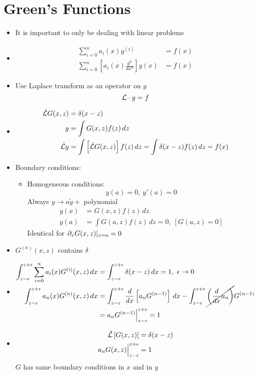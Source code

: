 \documentclass[Maths.tex]{subfiles}
\begin{document}
\section{Green's Functions}

\begin{itemize}
    \item It is important to only be dealing with linear problems
    \item
    \begin{align*}
        \sum_{i=0}^n a_i(x)y^{(i)} &= f(x) \\
        \sum_{i=0}^n \left[a_i(x)\frac{d^n}{dx^n}\right]y(x) &= f(x)
    \end{align*}
    \item Use Laplace transform as an operator on $y$
    \begin{equation*}
        \mathcal{L} \cdot y = f
    \end{equation*}
    \item
    \begin{align*}
        \hat{\mathcal{L}} G(x,z) &= \delta(x-z) \\
        y &= \int G(x,z)f(z)\,dz \\
        \hat{\mathcal{L}} y &= \int \left[\hat{\mathcal{L}}G(x,z)\right] f(z)\,dz = \int \delta(x-z)f(z)\,dz = f(x)
    \end{align*}
    \item Boundary conditions:
    \begin{itemize}
        \item Homogeneous conditions:
        \begin{equation*}
            y(a) = 0,~ y'(a) = 0
        \end{equation*}
        Always $y \to a\tilde{y} +$ polynomial
        \begin{align*}
            y(x) &= G(x,z)f(z)\,dz \\
            y(a) &= \int G(a,z)f(z)\,dz = 0, ~[G(a,z) = 0]
        \end{align*}
        Identical for $\partial_x G(x,z)|_{x=a} = 0$
    \end{itemize}
    \item $G^{(n)}(x,z)$ contains $\delta$
    \item
    \begin{align*}
        \int_{z-\epsilon}^{z+\epsilon} \sum_{i=0}^n a_i(x)G^{(i)}(x,z)\,dx &= \int_{z-\epsilon}^{z+\epsilon} \delta(x-z)\,dx = 1,~ \epsilon \to 0 \\
        \int_{z-\epsilon}^{z+\epsilon} a_n(x)G^{(n)}(x,z)\,dx &= \int_{z-\epsilon}^{z+\epsilon} \frac{d}{dx}\left[a_nG^{(n-1)}\right]\,dx - \int_{z-\epsilon}^{z+\epsilon} \cancel{\left(\frac{d}{dx}a_n\right)}G^{(n-1)} \\
        &= a_nG^{(n-1)}\Big|_{z-\epsilon}^{z+\epsilon} = 1
    \end{align*}
    \item
    \begin{align*}
        \hat{\mathcal{L}}\left[G(x,z)\right] &= \delta(x-z) \\
        a_nG(x,z)\Big|_{z-\epsilon}^{z+\epsilon} &= 1
    \end{align*}
    $G$ has same boundary conditions in $x$ and in $y$
\end{itemize}
\end{document}
